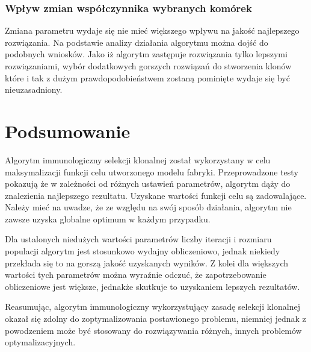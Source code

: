 \documentclass[a4paper]{article}
\begin{document}
\subsubsection{Wpływ zmian współczynnika wybranych komórek}
Zmiana parametru wydaje się nie mieć większego wpływu na jakość najlepszego rozwiązania.  Na podstawie analizy działania algorytmu można dojść do podobnych wniosków. Jako iż algorytm zastępuje rozwiązania tylko lepszymi rozwiązaniami, wybór dodatkowych gorszych rozwiązań do stworzenia klonów które i tak z dużym prawdopodobieństwem zostaną pominięte wydaje się być nieuzasadniony.

\section{Podsumowanie}

Algorytm immunologiczny selekcji klonalnej został wykorzystany w celu maksymalizacji funkcji celu utworzonego modelu fabryki. Przeprowadzone testy pokazują że w zależności od różnych ustawień parametrów, algorytm dąży do znalezienia najlepszego rezultatu. Uzyskane wartości funkcji celu są zadowalające. Należy mieć na uwadze, że ze względu na swój sposób działania, algorytm nie zawsze uzyska globalne optimum w każdym przypadku.

Dla ustalonych niedużych wartości parametrów liczby iteracji i rozmiaru populacji algorytm jest stosunkowo wydajny obliczeniowo, jednak niekiedy przekłada się to na gorszą jakość uzyskanych wyników. Z kolei dla większych wartości tych parametrów można wyraźnie odczuć, że zapotrzebowanie obliczeniowe jest większe, jednakże skutkuje to uzyskaniem lepszych rezultatów.

Reasumując, algorytm immunologiczny wykorzystujący zasadę selekcji klonalnej okazał się zdolny do zoptymalizowania postawionego problemu, niemniej jednak z powodzeniem może być stosowany do rozwiązywania różnych, innych problemów optymalizacyjnych.


\newpage
\printbibliography
\end{document}
